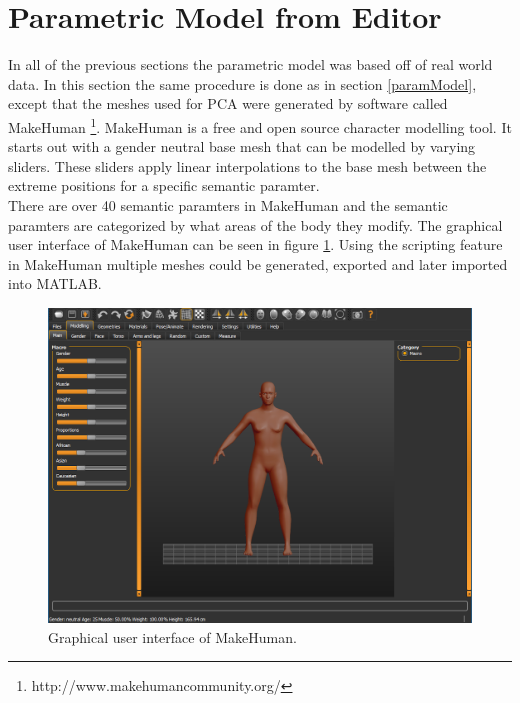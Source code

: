 \section{Parametric Model from Editor}
In all of the previous sections the parametric model was based off of real world data. In this section the same procedure is done as in section \ref{paramModel}, except that the meshes used for PCA were generated by software called MakeHuman \footnote{http://www.makehumancommunity.org/}. MakeHuman is a free and open source character modelling tool. It starts out with a gender neutral base mesh that can be modelled by varying sliders. These sliders apply linear interpolations to the base mesh between the extreme positions for a specific semantic paramter.\\
There are over 40 semantic paramters in MakeHuman and the semantic paramters are categorized by what areas of the body they modify. The graphical user interface of MakeHuman can be seen in figure \ref{fig:mhgui}. Using the scripting feature in MakeHuman multiple meshes could be generated, exported and later imported into MATLAB.

\begin{figure}[h]
\centering
\includegraphics[width=1\textwidth]{figures/mhgui}
\caption{Graphical user interface of MakeHuman.}
\label{fig:mhgui}
\end{figure}

